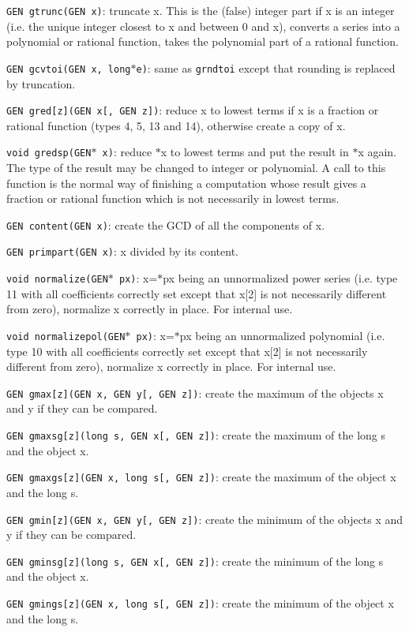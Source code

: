 {\tt GEN gtrunc(GEN x)}: truncate x. This is the (false) integer part if 
x is an integer (i.e. the unique integer closest to x and between 0 and
x), converts a series into a polynomial or rational function,
takes the polynomial part of a rational function.

{\tt GEN gcvtoi(GEN x, long$*$e)}: same as {\tt grndtoi} except that rounding
is replaced by truncation.

{\tt GEN gred[z](GEN x[, GEN z])}: reduce x to lowest terms if x is a fraction
or rational function (types 4, 5, 13 and 14), otherwise create a copy of x.

{\tt void gredsp(GEN$*$ x)}: reduce $*$x to lowest terms and put the result
in $*$x again. The type of the result may be changed to integer or polynomial.
A call to this function is the normal way of finishing a computation whose
result gives a fraction or rational function which is not necessarily in
lowest terms.

{\tt GEN content(GEN x)}: create the GCD of all the components of x.

{\tt GEN primpart(GEN x)}: x divided by its content.

{\tt void normalize(GEN$*$ px)}: x=$*$px being an unnormalized power series
(i.e. type 11 with all coefficients correctly set except that x[2] is not
necessarily different from zero), normalize x correctly in place. For
internal use.

{\tt void normalizepol(GEN$*$ px)}: x=$*$px being an unnormalized polynomial
(i.e. type 10 with all coefficients correctly set except that x[2] is not
necessarily different from zero), normalize x correctly in place. For
internal use.


{\tt GEN gmax[z](GEN x, GEN y[, GEN z])}: create the maximum of the objects x
and y if they can be compared.

{\tt GEN gmaxsg[z](long s, GEN x[, GEN z])}: create the maximum of the long s
and the object x.

{\tt GEN gmaxgs[z](GEN x, long s[, GEN z])}: create the maximum of the object 
x and the long s.

{\tt GEN gmin[z](GEN x, GEN y[, GEN z])}: create the minimum of the objects x
and y if they can be compared.

{\tt GEN gminsg[z](long s, GEN x[, GEN z])}: create the minimum of the long s
and the object x.

{\tt GEN gmings[z](GEN x, long s[, GEN z])}: create the minimum of the object 
x and the long s.

